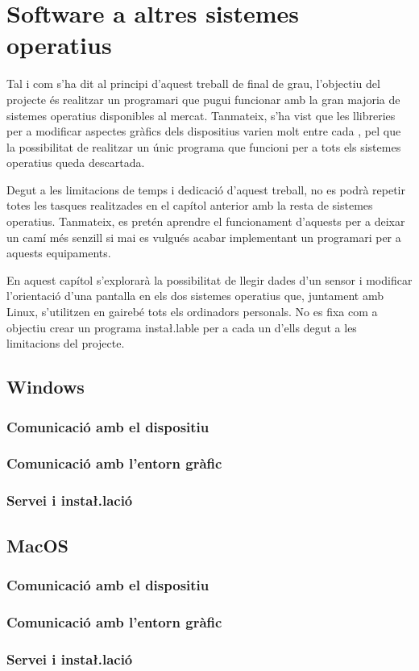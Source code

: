 \chapter{Software a altres sistemes operatius}
\label{cap:software-other}

Tal i com s'ha dit al principi d'aquest treball de final de grau, l'objectiu
del projecte és realitzar un programari que pugui funcionar amb la gran majoria
de sistemes operatius disponibles al mercat. Tanmateix, s'ha vist que les
llibreries per a modificar aspectes gràfics dels dispositius varien molt entre
cada , pel que la possibilitat de realitzar un únic programa que
funcioni per a tots els sistemes operatius queda descartada.

Degut a les limitacions de temps i dedicació d'aquest treball, no es podrà
repetir totes les tasques realitzades en el capítol anterior amb la resta
de sistemes operatius. Tanmateix, es pretén aprendre el funcionament d'aquests
per a deixar un camí més senzill si mai es vulgués acabar implementant un
programari per a aquests equipaments.

En aquest capítol s'explorarà la possibilitat de llegir dades d'un sensor
 i modificar l'orientació d'una pantalla en els dos sistemes operatius
que, juntament amb Linux, s'utilitzen en gairebé tots els ordinadors personals.
No es fixa com a objectiu crear un programa insta\l.lable per a cada un d'ells
degut a les limitacions del projecte.

\section{Windows}
\subsection{Comunicació amb el dispositiu}
\subsection{Comunicació amb l'entorn gràfic}
\subsection{Servei i insta\l.lació}

\section{MacOS}
\subsection{Comunicació amb el dispositiu}
\subsection{Comunicació amb l'entorn gràfic}
\subsection{Servei i insta\l.lació}

